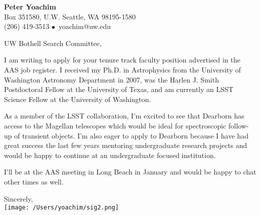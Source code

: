 \documentclass[12pt]{letter}
\begin{document}
\signature{\\ Peter Yoachim}                  %
\longindentation=0pt                     %
\let\raggedleft\raggedright              %
 
\begin{letter}{}

\begin{center}
{\large\bf {\Large{Peter Yoachim}}} \\
{  Box 351580, U.W. 
 Seattle, WA 98195-1580\\ (206) 419-3513 $\bullet$\ yoachim@uw.edu} 
\end{center} \vfill %
 
\opening{UW Bothell Search Committee,}

I am writing to apply for your tenure track faculty position advertised in the AAS job register.  I received my Ph.D. in Astrophysics from the University of Washington Astronomy Department in 2007, was the Harlen J. Smith Postdoctoral Fellow at the University of Texas, and am currently an LSST Science Fellow at the University of Washington. 

As a member of the LSST collaboration, I'm excited to see that Dearborn has access to the Magellan telescopes which would be ideal for spectroscopic follow-up of transient objects.  I'm also eager to apply to Dearborn because I have had great success the last few years mentoring undergraduate research projects and would be happy to continue at an undergraduate focused institution.


I'll be at the AAS meeting in Long Beach in January and would be happy to chat other times as well.


Sincerely,\\
\texttt{[image: /Users/yoachim/sig2.png]}
 











\end{letter}
 
\end{document}
